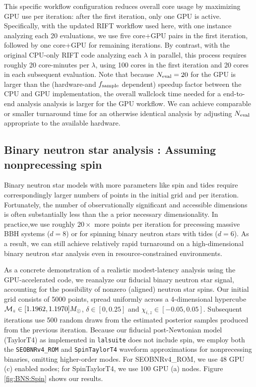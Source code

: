 \documentclass[twocolumn,prd,nofootinbib]{revtex4}
\newcommand{\mc}{{\cal M}}
\begin{document}
This specific workflow configuration  reduces overall core usage by maximizing GPU use per iteration: after the first
iteration, only one GPU is active.   
Specifically,  with the updated RIFT workflow used here, with one instance analyzing each 20 evaluations,  we use five
core+GPU pairs in the
first iteration, followed by one core+GPU for remaining iterations.
By contrast, with the original CPU-only RIFT code analyzing each $\lambda$ in parallel, this process requires roughly 20 core-minutes
per $\lambda$, using 100 cores in the first iteration and 20 cores in each
subsequent evaluation.   
Note that  because   $N_{\rm eval}=20$ for the GPU is larger than the (hardware-and $f_{\rm sample}$ dependent)  speedup factor between the CPU and
GPU implementation, the overall wallclock time needed for a end-to-end
analysis analysis is larger for the GPU workflow.
We can achieve comparable or smaller turnaround time for an otherwise identical analysis by adjusting $N_{\rm eval}$ appropriate to the available hardware.









\subsection{Binary neutron star analysis : Assuming  nonprecessing spin}
\label{sec:sub:BNS_spin}


Binary neutron star models with more parameters like spin and tides require correspondingly larger numbers of points in the
  initial grid and per iteration.  Fortunately, the number of observationally significant and accessible dimensions is often
  substantially less than the a prior necessary dimensionality.  In practice,we use roughly $20\times$ more points per
  iteration for precessing massive BBH systems ($d=8$) or for spinning binary neutron stars with tides ($d=6$).    As a
  result, we can still achieve relatively rapid turnaround on a high-dimensional binary neutron star analysis even in
  resource-constrained environments.

As a concrete demonstration of a realistic modest-latency analysis using the GPU-accelerated code, we reanalyze our fiducial binary
neutron star signal, accounting for the possibility of nonzero (aligned) neutron star spins.  Our initial grid consists of 5000 points, spread uniformly across a 4-dimensional
hypercube $\mc_z\in[1.1962,1.1970] M_\odot$, $\delta \in[0,0.25]$ and $\chi_{i,z}\in[-0.05,0.05]$.  Subsequent
iterations use 500 random draws from the estimated posterior samples produced from the previous iteration.  
Because  our fiducial post-Newtonian model (TaylorT4) as implemented in \texttt{lalsuite}\cite{lalsuite} does not include spin, we
employ both the \texttt{SEOBNRv4\_ROM} and \texttt{SpinTaylorT4} waveform approximations for nonprecessing binaries,
omitting higher-order modes.   For SEOBNRv4\_ROM, we use 48 GPU (c) enabled nodes; for SpinTaylorT4, we use 100 GPU (a) nodes.
%
Figure \ref{fig:BNS:Spin} shows our results.
%
\end{document}

